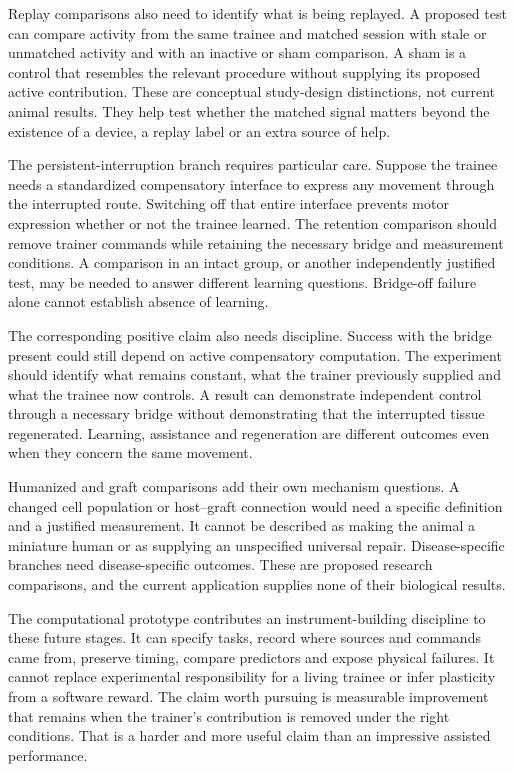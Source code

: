 Replay comparisons also need to identify what is being replayed. A proposed test can compare activity from the same trainee and matched session with stale or unmatched activity and with an inactive or sham comparison. A sham is a control that resembles the relevant procedure without supplying its proposed active contribution. These are conceptual study-design distinctions, not current animal results. They help test whether the matched signal matters beyond the existence of a device, a replay label or an extra source of help.

The persistent-interruption branch requires particular care. Suppose the trainee needs a standardized compensatory interface to express any movement through the interrupted route. Switching off that entire interface prevents motor expression whether or not the trainee learned. The retention comparison should remove trainer commands while retaining the necessary bridge and measurement conditions. A comparison in an intact group, or another independently justified test, may be needed to answer different learning questions. Bridge-off failure alone cannot establish absence of learning.

The corresponding positive claim also needs discipline. Success with the bridge present could still depend on active compensatory computation. The experiment should identify what remains constant, what the trainer previously supplied and what the trainee now controls. A result can demonstrate independent control through a necessary bridge without demonstrating that the interrupted tissue regenerated. Learning, assistance and regeneration are different outcomes even when they concern the same movement.

Humanized and graft comparisons add their own mechanism questions. A changed cell population or host--graft connection would need a specific definition and a justified measurement. It cannot be described as making the animal a miniature human or as supplying an unspecified universal repair. Disease-specific branches need disease-specific outcomes. These are proposed research comparisons, and the current application supplies none of their biological results.

The computational prototype contributes an instrument-building discipline to these future stages. It can specify tasks, record where sources and commands came from, preserve timing, compare predictors and expose physical failures. It cannot replace experimental responsibility for a living trainee or infer plasticity from a software reward. The claim worth pursuing is measurable improvement that remains when the trainer's contribution is removed under the right conditions. That is a harder and more useful claim than an impressive assisted performance.

